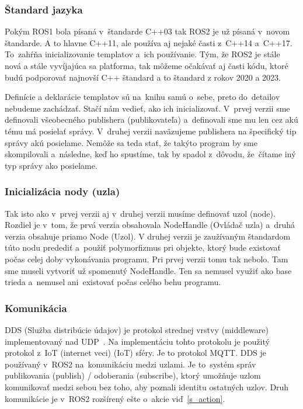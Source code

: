 \subsubsection{Štandard jazyka}

	Pokým ROS1 bola písaná v~štandarde C++03 tak ROS2 je už písaná v~novom štandarde. A to hlavne C++11, ale používa aj nejaké časti z~C++14
	a~C++17. To~zahŕňa inicializovanie templatov a~ich používanie. Tým, že ROS2 je stále nová a stále vyvíjajúca sa platforma, tak môžeme očakávať aj časti
	kódu, ktoré budú podporovať najnovší C++ štandard a to štandard z rokov 2020 a 2023.

	Definície a deklarácie templatov sú na~knihu samú o~sebe, preto do~detailov nebudeme zachádzať. Stačí nám vedieť, ako ich inicializovať.
	V~prvej verzii sme definovali všeobecného publishera (publikovateľa) a~definovali sme mu len cez akú tému má posielať správy. V~druhej verzii
	naväzujeme publishera na špecifický tip správy akú posielame. Nemôže sa teda stať, že takýto program by sme skompilovali a~následne, keď
	ho spustíme, tak by spadol z~dôvodu, že~čítame iný typ správy ako posielame.

\subsubsection{Inicializácia nody (uzla)}

	Tak isto ako v~prvej verzii aj v~druhej verzii musíme definovať uzol (node). Rozdiel je v~tom, že prvá verzia obsahovala NodeHandle (Ovládač uzla)
	a~druhá verzia obsahuje priamo Node (Uzol). V druhej verzii je zaužívaným štandardom túto nodu predediť a~použiť polymorfizmus pri objekte,
	ktorý bude existovať počas celej doby vykonávania programu. Pri prvej verzii tomu tak nebolo. Tam sme museli vytvoriť už spomenutý NodeHandle.
	Ten sa nemusel využiť ako base trieda a~nemusel ani~existovať počas celého behu programu.

\subsubsection{Komunikácia}

	DDS (Služba distribúcie údajov) je protokol strednej vrstvy (middleware) implementovaný nad UDP~\cite{ROS2book}. Na implementáciu tohto protokolu
	je použitý protokol z~IoT (internet veci) (\acrlong{IoT}) sféry. Je to protokol MQTT. DDS je používaný v~ROS2 na~komunikáciu medzi uzlami. Je
	to~systém správ publikovania (publish) / odoberania (subscribe), ktorý umožňuje uzlom komunikovať medzi sebou bez toho, aby poznali identitu
	ostatných uzlov. Druh komunikácie je v~ROS2 rozšírený ešte o~akcie viď~\ref{s_action}.

